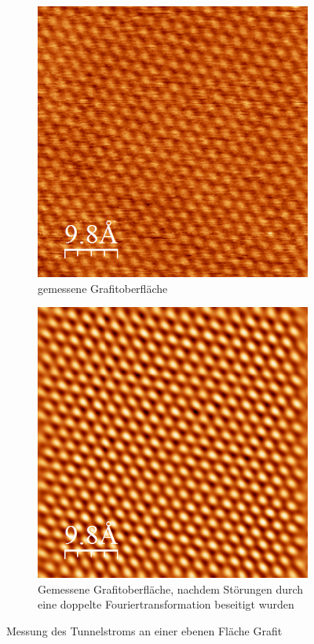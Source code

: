\documentclass[10pt,a4paper]{article}
\begin{document}
\begin{figure}[h]
	\centering
	\begin{subfigure}{0.45\textwidth}
		\centering
		\includegraphics[width=\textwidth]{vor_doppelter_fourier.png}
		\caption{gemessene Grafitoberfläche}
		\label{grafob1}
	\end{subfigure}
	\begin{subfigure}{0.45\textwidth}
		\centering
		\includegraphics[width=\textwidth]{nach_doppelter_fourier.png}
		\caption{Gemessene Grafitoberfläche, nachdem Störungen durch eine doppelte Fouriertransformation beseitigt wurden}
		\label{grafob2}
	\end{subfigure}
	
	\caption{Messung des Tunnelstroms an einer ebenen Fläche Grafit}
	\label{Grafitoberflächenebene}
\end{figure}
\end{document}
